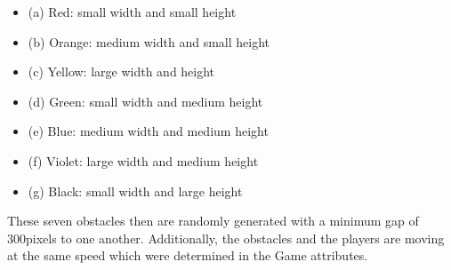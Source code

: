 \documentclass[journal]{IEEEtran}
\begin{document}
\begin{itemize}
\item(a) Red: small width and small height 
\item(b) Orange: medium width and small height 
\item(c) Yellow: large width and height 
\item(d) Green: small width and medium height 
\item(e) Blue: medium width and medium height 
\item(f) Violet: large width and medium height 
\item(g) Black: small width and large height    
\end{itemize}

These seven obstacles then are randomly generated with a minimum gap of 300pixels to one another. Additionally, the obstacles and the players are moving at the same speed which were determined in the Game attributes.
\end{document}
